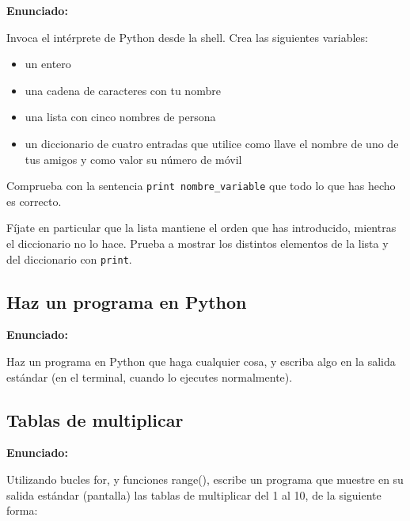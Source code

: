 \textbf{Enunciado:}

Invoca el intérprete de Python desde la shell. Crea las siguientes
variables:

\begin{itemize}
\item un entero
\item una cadena de caracteres con tu nombre
\item una lista con cinco nombres de persona
\item un diccionario de cuatro
entradas que utilice como llave el nombre de uno de tus amigos y como valor su
número de móvil
\end{itemize}

Comprueba con la sentencia \verb|print nombre_variable| que todo lo
que has hecho es correcto.

Fíjate en particular que la lista mantiene el
orden que has introducido, mientras el diccionario no lo hace. Prueba a mostrar 
los distintos elementos de la lista y del diccionario con \verb|print|.

\subsection{Haz un programa en Python}
\label{subsec:eje-python-primer-programa}

\textbf{Enunciado:}

Haz un programa en Python que haga cualquier cosa, y escriba algo en la salida estándar (en el terminal, cuando lo ejecutes normalmente).


\subsection{Tablas de multiplicar}
\label{subsec:eje-python-tablas}

\textbf{Enunciado:}

Utilizando bucles for, y funciones range(), escribe un programa que muestre en su salida estándar (pantalla) las tablas de multiplicar del 1 al 10, de la siguiente forma:

